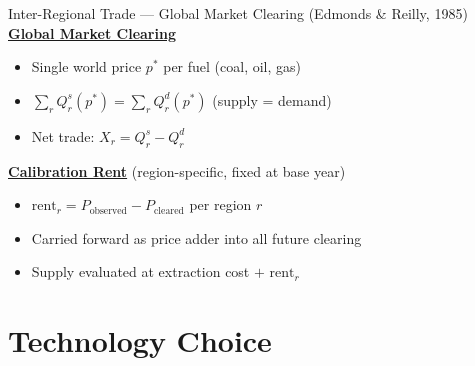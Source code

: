 \documentclass[aspectratio=169, 10pt]{beamer}
\newcommand{\bi}{\begin{itemize}}
\newcommand{\ei}{\end{itemize}}
\begin{document}


\begin{frame}[t]{Inter-Regional Trade --- Global Market Clearing (Edmonds \& Reilly, 1985)}
\vspace{0.3em}
\textbf{\underline{Global Market Clearing}}
\bi \small
  \item Single world price $p^*$ per fuel (coal, oil, gas)
  \item $\sum_r Q^s_r(p^*) = \sum_r Q^d_r(p^*)$ \quad (supply = demand)
  \item Net trade: $X_r = Q^s_r - Q^d_r$
\ei

\vspace{0.8em}
\textbf{\underline{Calibration Rent}} {\small (region-specific, fixed at base year)}
\bi \small
  \item $\mathrm{rent}_r = P_{\mathrm{observed}} - P_{\mathrm{cleared}}$ \quad per region $r$
  \item Carried forward as price adder into all future clearing
  \item Supply evaluated at extraction cost $+$ $\mathrm{rent}_r$
\ei
\end{frame}

\section{Technology Choice}
\end{document}
